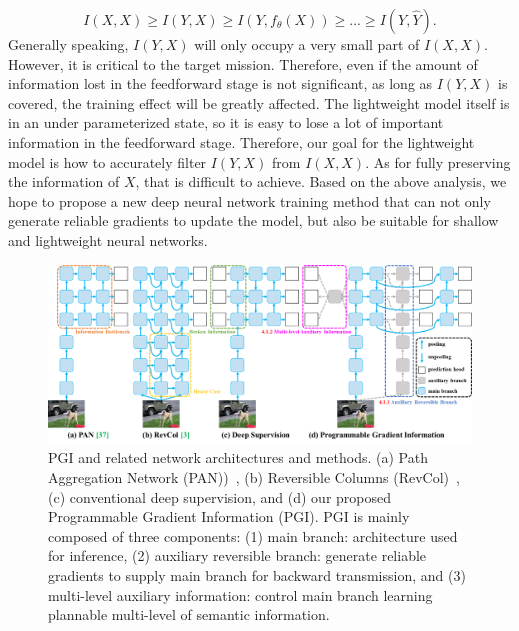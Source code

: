 \documentclass[10pt,twocolumn,letterpaper]{article}
\begin{document}
	\begin{equation}
	I(X,X) \geq I(Y,X) \geq I(Y, f_{\theta}(X)) \geq ... \geq I(Y,\hat{Y}).
	\label{eq:ibpy}
	\end{equation}		
	Generally speaking, $I(Y,X)$ will only occupy a very small part of $I(X,X)$.  However, it is critical to the target mission.  Therefore, even if the amount of information lost in the feedforward stage is not significant, as long as $I(Y,X)$ is covered, the training effect will be greatly affected.  The lightweight model itself is in an under parameterized state, so it is easy to lose a lot of important information in the feedforward stage.  Therefore, our goal for the lightweight model is how to accurately filter $I(Y,X)$ from $I(X,X)$.  As for fully preserving the information of $X$, that is difficult to achieve.  Based on the above analysis, we hope to propose a new deep neural network training method that can not only generate reliable gradients to update the model, but also be suitable for shallow and lightweight neural networks.
	
	\begin{figure}[t]
		\begin{center}
			\includegraphics[width=1.\linewidth]{figs/pgi}
		\end{center}
		\vspace{-12pt}
		\caption{PGI and related network architectures and methods.  (a) Path Aggregation Network (PAN))~\cite{liu2018path}, (b) Reversible Columns (RevCol)~\cite{cai2022reversible}, (c) conventional deep supervision, and (d) our proposed Programmable Gradient Information (PGI).  PGI is mainly composed of three components: (1) main branch: architecture used for inference, (2) auxiliary reversible branch: generate reliable gradients to supply main branch for backward transmission, and (3) multi-level auxiliary information: control main branch learning plannable multi-level of semantic information.}		
		\vspace{-12pt}
		\label{fig:pgi}
	\end{figure}
	
\end{document}

